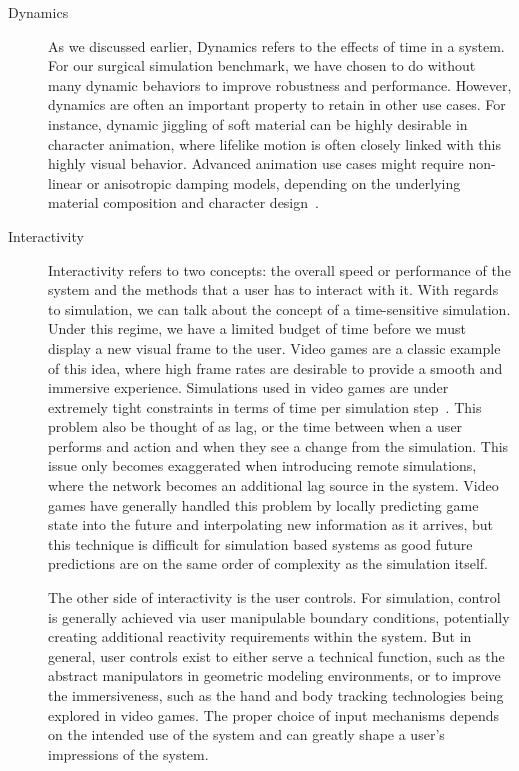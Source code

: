 \begin{description}
\item[Dynamics] As we discussed earlier, Dynamics refers to the
  effects of time in a system. For our surgical simulation benchmark,
  we have chosen to do without many dynamic behaviors to improve
  robustness and performance. However, dynamics are often an important
  property to retain in other use cases. For instance, dynamic
  jiggling of soft material can be highly desirable in character
  animation, where lifelike motion is often closely linked with this
  highly visual behavior. Advanced animation use cases might require
  non-linear or anisotropic damping models, depending on the
  underlying material composition and character design~\citep{Xu:2017:EBD}.



  

\item[Interactivity] Interactivity refers to two concepts: the overall
  speed or performance of the system and the methods that a user has
  to interact with it. With regards to simulation, we can talk about
  the concept of a time-sensitive simulation. Under this regime, we
  have a limited budget of time before we must display a new visual
  frame to the user. Video games are a classic example of this idea,
  where high frame rates are desirable to provide a smooth and
  immersive experience. Simulations used in video games are under
  extremely tight constraints in terms of time per simulation
  step~\citep{ParkeO:2009}. This problem also be thought of as lag, or
  the time between when a user performs and action and when they see a
  change from the simulation. This issue only becomes exaggerated when
  introducing remote simulations, where the network becomes an
  additional lag source in the system. Video games have generally
  handled this problem by locally predicting game state into the
  future and interpolating new information as it arrives, but this
  technique is difficult for simulation based systems as good future
  predictions are on the same order of complexity as the simulation itself.

  The other side of interactivity is the user controls. For
  simulation, control is generally achieved via user manipulable
  boundary conditions, potentially creating additional reactivity
  requirements within the system. But in general, user controls exist
  to either serve a technical function, such as the abstract
  manipulators in geometric modeling environments, or to improve the
  immersiveness, such as the hand and body tracking technologies being
  explored in video games. The proper choice of input mechanisms
  depends on the intended use of the system and can greatly shape a
  user's impressions of the system.


\end{description}
